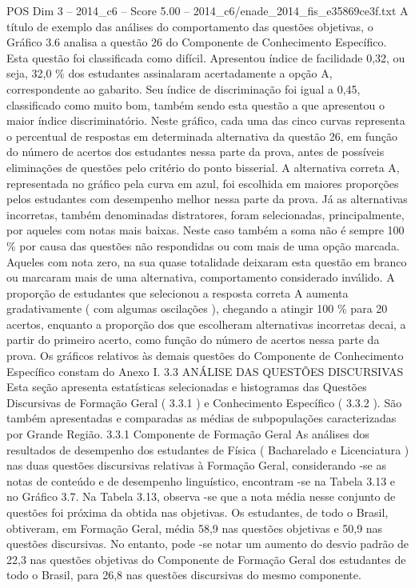 \begin{textsample}{POS Dim 3 – 2014\_c6 – Score 5.00 – 2014\_c6/enade\_2014\_fis\_e35869ce3f.txt}
A título de exemplo das análises do comportamento das questões objetivas, o Gráfico 3.6 analisa a questão 26 do Componente de Conhecimento Específico.
Esta questão foi classificada como difícil.
Apresentou índice de facilidade 0,32, ou seja, 32,0 \% dos estudantes assinalaram acertadamente a opção A, correspondente ao gabarito.
Seu índice de discriminação foi igual a 0,45, classificado como muito bom, também sendo esta questão a que apresentou o maior índice discriminatório.
Neste gráfico, cada uma das cinco curvas representa o percentual de respostas em determinada alternativa da questão 26, em função do número de acertos dos estudantes nessa parte da prova, antes de possíveis eliminações de questões pelo critério do ponto bisserial.
A alternativa correta A, representada no gráfico pela curva em azul, foi escolhida em maiores proporções pelos estudantes com desempenho melhor nessa parte da prova.
Já as alternativas incorretas, também denominadas distratores, foram selecionadas, principalmente, por aqueles com notas mais baixas.
Neste caso também a soma não é sempre 100 \% por causa das questões não respondidas ou com mais de uma opção marcada.
Aqueles com nota zero, na sua quase totalidade deixaram esta questão em branco ou marcaram mais de uma alternativa, comportamento considerado inválido.
A proporção de estudantes que selecionou a resposta correta A aumenta gradativamente ( com algumas oscilações ), chegando a atingir 100 \% para 20 acertos, enquanto a proporção dos que escolheram alternativas incorretas decai, a partir do primeiro acerto, como função do número de acertos nessa parte da prova.
Os gráficos relativos às demais questões do Componente de Conhecimento Específico constam do Anexo I. 3.3 ANÁLISE DAS QUESTÕES DISCURSIVAS Esta seção apresenta estatísticas selecionadas e histogramas das Questões Discursivas de Formação Geral ( 3.3.1 ) e Conhecimento Específico ( 3.3.2 ).
São também apresentadas e comparadas as médias de subpopulações caracterizadas por Grande Região. 3.3.1 Componente de Formação Geral As análises dos resultados de desempenho dos estudantes de Física ( Bacharelado e Licenciatura ) nas duas questões discursivas relativas à Formação Geral, considerando -se as notas de conteúdo e de desempenho linguístico, encontram -se na Tabela 3.13 e no Gráfico 3.7.
Na Tabela 3.13, observa -se que a nota média nesse conjunto de questões foi próxima da obtida nas objetivas.
Os estudantes, de todo o Brasil, obtiveram, em Formação Geral, média 58,9 nas questões objetivas e 50,9 nas questões discursivas.
No entanto, pode -se notar um aumento do desvio padrão de 22,3 nas questões objetivas do Componente de Formação Geral dos estudantes de todo o Brasil, para 26,8 nas questões discursivas do mesmo componente.

\end{textsample}
